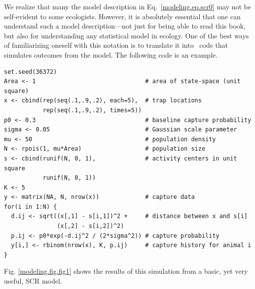 We realize that many the model description in Eq.~\ref{modeling.eq.scr0} may not be
self-evident to some ecologists. However, it is absolutely essential
that one can understand such a model description---not just for being
able to read this book, but also for understanding any statistical
model in ecology. One of the best ways of familiarizing oneself with
this notation is to translate it into \R~code that simulates outcomes
from the model. The following code is an example.
\begin{small}
\begin{verbatim}
set.seed(36372)
Area <- 1                               # area of state-space (unit square)
x <- cbind(rep(seq(.1,.9,.2), each=5),  # trap locations
           rep(seq(.1,.9,.2), times=5))
p0 <- 0.3                               # baseline capture probability
sigma <- 0.05                           # Gaussian scale parameter
mu <- 50                                # population density
N <- rpois(1, mu*Area)                  # population size
s <- cbind(runif(N, 0, 1),              # activity centers in unit square
           runif(N, 0, 1))
K <- 5
y <- matrix(NA, N, nrow(x))             # capture data
for(i in 1:N) {
  d.ij <- sqrt((x[,1] - s[i,1])^2 +     # distance between x and s[i]
               (x[,2] - s[i,2])^2)
  p.ij <- p0*exp(-d.ij^2 / (2*sigma^2)) # capture probability
  y[i,] <- rbinom(nrow(x), K, p.ij)     # capture history for animal i
}
\end{verbatim}
\end{small}
Fig. \ref{modeling.fig.fig1} shows the results of this simulation from a
basic, yet very useful, SCR model.

